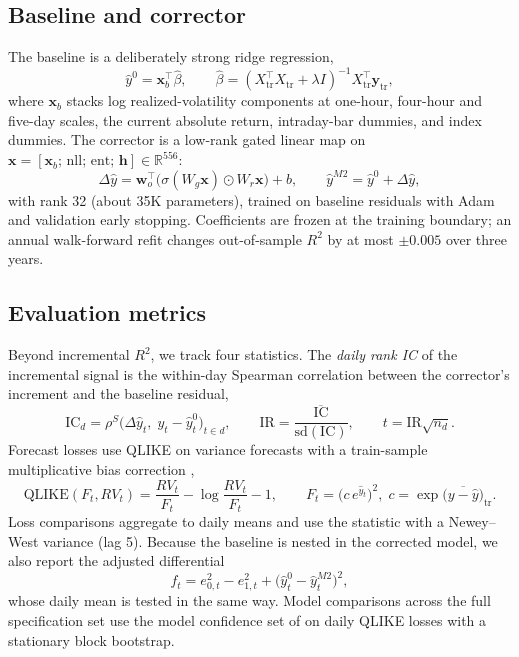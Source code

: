 \documentclass[12pt]{article}
\begin{document}
\subsection{Baseline and corrector}
The baseline is a deliberately strong ridge regression,
\begin{equation}
\hat{y}^{0} = \mathbf{x}_b^{\top}\hat\beta, \qquad
\hat\beta = (X_{\mathrm{tr}}^\top X_{\mathrm{tr}} + \lambda I)^{-1}
X_{\mathrm{tr}}^\top \mathbf{y}_{\mathrm{tr}},
\end{equation}
where $\mathbf{x}_b$ stacks log realized-volatility components at one-hour,
four-hour and five-day scales, the current absolute return, intraday-bar
dummies, and index dummies. The corrector is a low-rank gated linear map on
$\mathbf{x} = [\mathbf{x}_b;\,\mathrm{nll};\,\mathrm{ent};\,\mathbf{h}]
\in \mathbb{R}^{556}$:
\begin{equation}
\Delta\hat{y} = \mathbf{w}_o^{\top}\big(\sigma(W_g\mathbf{x}) \odot
W_r\mathbf{x}\big) + b, \qquad
\hat{y}^{M2} = \hat{y}^{0} + \Delta\hat{y},
\end{equation}
with rank 32 (about 35K parameters), trained on baseline residuals with Adam
and validation early stopping. Coefficients are frozen at the training
boundary; an annual walk-forward refit changes out-of-sample $R^2$ by at most
$\pm0.005$ over three years.

\subsection{Evaluation metrics}
Beyond incremental $R^2$, we track four statistics. The \emph{daily rank IC}
of the incremental signal is the within-day Spearman correlation between the
corrector's increment and the baseline residual,
\begin{equation}
\mathrm{IC}_d = \rho^{S}\!\big(\Delta\hat{y}_t,\; y_t - \hat{y}^{0}_t\big)_{t \in d},
\qquad
\mathrm{IR} = \frac{\overline{\mathrm{IC}}}{\mathrm{sd}(\mathrm{IC})},
\qquad t = \mathrm{IR}\sqrt{n_d}.
\end{equation}
Forecast losses use QLIKE on variance forecasts with a train-sample
multiplicative bias correction \citep{patton2011volatility},
\begin{equation}
\mathrm{QLIKE}(F_t, RV_t) = \frac{RV_t}{F_t} - \log\frac{RV_t}{F_t} - 1,
\qquad F_t = \big(c\,e^{\hat{y}_t}\big)^2 ,\;
c = \exp\!\big(\overline{y-\hat{y}}\big)_{\mathrm{tr}}.
\end{equation}
Loss comparisons aggregate to daily means and use the \citet{diebold1995dm}
statistic with a Newey--West variance (lag 5). Because the baseline is nested
in the corrected model, we also report the \citet{clark2007cw} adjusted
differential
\begin{equation}
f_t = e_{0,t}^2 - e_{1,t}^2 + \big(\hat{y}^{0}_t - \hat{y}^{M2}_t\big)^2 ,
\end{equation}
whose daily mean is tested in the same way. Model comparisons across the full
specification set use the model confidence set of \citet{hansen2011mcs} on
daily QLIKE losses with a stationary block bootstrap.
\end{document}
